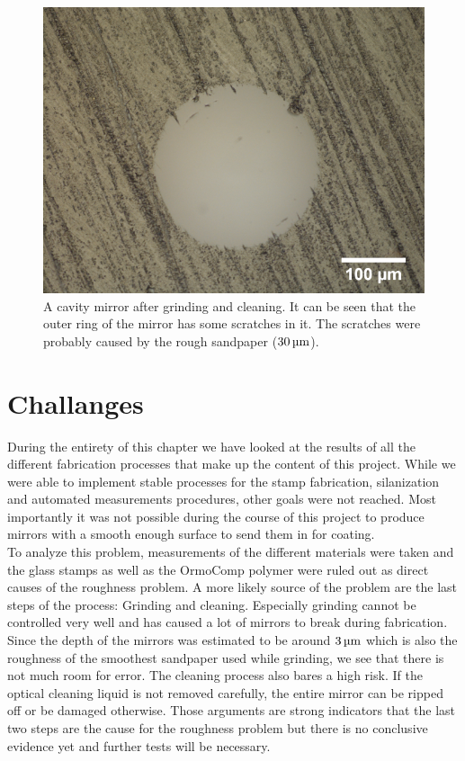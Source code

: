 \begin{figure}[H]
	\includegraphics[scale=1]{source/grinded_cleaned_compressed}
	\caption{A cavity mirror after grinding and cleaning. It can be seen that the outer ring of the mirror has some scratches in it. The scratches were probably caused by the rough sandpaper ($30\um$).}
\end{figure}

\section{Challanges}\label{ChapProblems}
During the entirety of this chapter we have looked at the results of all the different fabrication processes that make up the content of this project. While we were able to implement stable processes for the stamp fabrication, silanization and automated measurements procedures, other goals were not reached. Most importantly it was not possible during the course of this project to produce mirrors with a smooth enough surface to send them in for coating.\\
To analyze this problem, measurements of the different materials were taken and the glass stamps as well as the OrmoComp polymer were ruled out as direct causes of the roughness problem. A more likely source of the problem are the last steps of the process: Grinding and cleaning. Especially grinding cannot be controlled very well and has caused a lot of mirrors to break during fabrication. Since the depth of the mirrors was estimated to be around $3\um$ which is also the roughness of the smoothest sandpaper used while grinding, we see that there is not much room for error. The cleaning process also bares a high risk. If the optical cleaning liquid is not removed carefully, the entire mirror can be ripped off or be damaged otherwise. Those arguments are strong indicators that the last two steps are the cause for the roughness problem but there is no conclusive evidence yet and further tests will be necessary.

